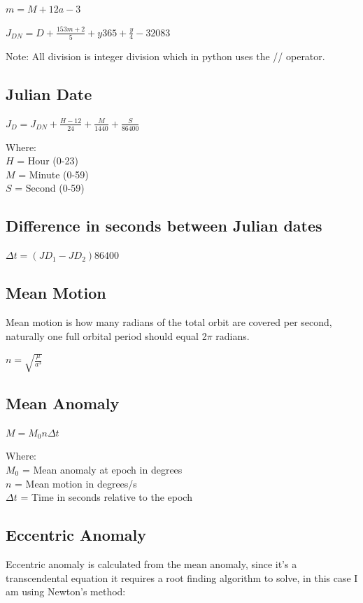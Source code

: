 \documentclass{article}
\begin{document}
$ m = M + 12 a - 3 $

$J_{DN} = D + \frac{153m+2}{5} + y365 + \frac{y}{4} - 32083$

Note: All division is integer division which in python uses the // operator.

\subsection{Julian Date}

$ J_{D} = J_{DN} + \frac{H-12}{24} + \frac{M}{1440} + \frac{S}{86400} $

Where:\\
$H$ = Hour (0-23)\\
$M$ = Minute (0-59)\\
$S$ = Second (0-59)

\subsection{Difference in seconds between Julian dates}

$ \Delta t =  (JD_1 - JD_2) 86400 $

\subsection{Mean Motion}

Mean motion is how many radians of the total orbit are covered per second, naturally one full orbital period should equal 2$\pi$ radians.

$ n = \sqrt{\frac{\mu}{a^3}} $

\subsection{Mean Anomaly}

$ M = M_0 n \Delta t $

Where:\\
$M_0$ = Mean anomaly at epoch in degrees\\
$n$ = Mean motion in degrees/s\\
$\Delta t$ = Time in seconds relative to the epoch

\subsection{Eccentric Anomaly}

Eccentric anomaly is calculated from the mean anomaly, since it's a transcendental equation it requires a root finding algorithm to solve, in this case I am using Newton's method:
\end{document}
